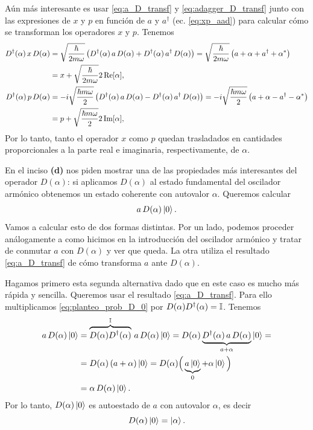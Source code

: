 \documentclass[10pt, a4paper]{article}
\newcommand{\xprefactsq}{\frac{\hbar}{2m\omega}}
\newcommand{\xprefact}{\sqrt{\xprefactsq}}
\newcommand{\pprefactsq}{\frac{\hbar m \omega}{2}}
\newcommand{\pprefact}{\sqrt{\pprefactsq}}
\numberwithin{equation}{subsection}
\begin{document}
Aún más interesante es usar \eqref{eq:a_D_transf} y \eqref{eq:adagger_D_transf}
junto con las expresiones de $x$ y $p$ en función de $a$ y $a^\dagger$ (ec.
\eqref{eq:xp_aad}) para calcular cómo se transforman los operadores $x$ y $p$.
Tenemos
\begin{align}
  D^\dagger(\alpha)\,x\,D(\alpha) &= \xprefact\left(
    D^\dagger(\alpha)\,a\,D(\alpha) + D^\dagger(\alpha)\,a^\dagger\,D(\alpha)
    \right) = \xprefact\left(a + \alpha + a^\dagger + \conj{\alpha}\right)
    \nonumber \\
  &= x + \xprefact 2\Re[\alpha], \label{eq:x_D_transf} \\
  D^\dagger(\alpha)\,p\,D(\alpha) &= -i\pprefact\left(
    D^\dagger(\alpha)\,a\,D(\alpha) - D^\dagger(\alpha)\,a^\dagger\,D(\alpha)
    \right) = -i\pprefact\left(a + \alpha - a^\dagger - \conj{\alpha}\right)
    \nonumber \\
  &= p + \pprefact 2\Im[\alpha], \label{eq:p_D_transf}
\end{align}
Por lo tanto, tanto el operador $x$ como $p$ quedan trasladados en cantidades
proporcionales a la parte real e imaginaria, respectivamente, de $\alpha$.

\bigbreak

En el inciso \textbf{(d)} nos piden mostrar una de las propiedades más
interesantes del operador $D(\alpha)$: si aplicamos $D(\alpha)$ al estado
fundamental del oscilador armónico obtenemos un estado coherente con autovalor
$\alpha$. Queremos calcular
\begin{equation} \label{eq:planteo_prob_D_0}
  a\,D(\alpha)\ket{0}.
\end{equation}
Vamos a calcular esto de dos formas distintas. Por un lado, podemos proceder
análogamente a como hicimos en la introducción del oscilador armónico y tratar
de conmutar $a$ con $D(\alpha)$ y ver que queda. La otra utiliza el resultado
\eqref{eq:a_D_transf} de cómo transforma $a$ ante $D(\alpha)$.

Hagamos primero esta segunda alternativa dado que en este caso es mucho más
rápida y sencilla. Queremos usar el resultado \eqref{eq:a_D_transf}. Para ello
multiplicamos \eqref{eq:planteo_prob_D_0} por $D(\alpha)D^\dagger(\alpha) =
\mathbb{I}$. Tenemos
\begin{align}
  a\,D(\alpha)\ket{0} &= 
    \overbrace{D(\alpha)D^{\dagger}(\alpha)}^{\mathbb{I}}\,a\,D(\alpha)\ket{0} = 
    D(\alpha)\underbrace{D^{\dagger}(\alpha)\,a\,D(\alpha)}_{a + \alpha}\ket{0}
    = \nonumber \\
  &= D(\alpha)\left(a + \alpha\right)\ket{0} =
    D(\alpha)\Big(\underbrace{a\ket{0}}_{0} + \alpha\ket{0}\Big) \nonumber \\
  &= \alpha\,D(\alpha)\ket{0}.
\end{align}
Por lo tanto, $D(\alpha)\ket{0}$ es autoestado de $a$ con autovalor $\alpha$,
es decir
\begin{equation}
  D(\alpha)\ket{0} = \ket{\alpha}.
\end{equation}
\end{document}
